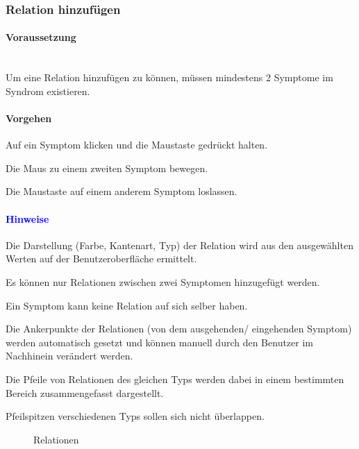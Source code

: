 \documentclass[enabledeprecatedfontcommands,fontsize=11pt,paper=a4,twoside]{scrartcl}
\newcounter{one}
\newcounter{two}[one]
\newcommand*{\hint}{\paragraph{\textcolor{blue}{Hinweise}}}
\newcommand*{\condition}{\paragraph{Voraussetzung}$\;$ \vspace{0.2cm}\\}
\newcommand*{\action}{\paragraph{Vorgehen}}
\let\tempone\itemize
\let\temptwo\enditemize
\renewenvironment{itemize}{\tempone\addtolength{\itemsep}{-10.0pt}}{\temptwo}
\let\origenumerate\enumerate
\let\origendenumerate\endenumerate
\renewenvironment{enumerate}{\origenumerate \addtolength{\itemsep}{-10.0pt}}{\origendenumerate}
\begin{document}
		\subsubsection{Relation hinzufügen}
		\condition
		Um eine Relation hinzufügen zu können, müssen mindestens 2 Symptome im Syndrom existieren. 
		\action
		\begin{enumerate}
			\item Auf ein Symptom klicken und die Maustaste gedrückt halten.
			\item Die Maus zu einem zweiten Symptom bewegen. 
			\item Die Maustaste auf einem anderem Symptom loslassen. 
		\end{enumerate}
		\hint
		\begin{itemize}
			\item Die Darstellung (Farbe, Kantenart, Typ) der Relation wird aus den ausgewählten Werten auf der Benutzeroberfläche ermittelt. 
			\item Es können nur Relationen zwischen zwei Symptomen hinzugefügt werden. 
			\item Ein Symptom kann keine Relation auf sich selber haben.
			\item Die Ankerpunkte der Relationen (von dem ausgehenden/ eingehenden Symptom) werden automatisch gesetzt und können manuell durch den Benutzer im Nachhinein verändert werden. 
			\item Die Pfeile von Relationen des gleichen Typs werden dabei in einem bestimmten Bereich zusammengefasst dargestellt. 
			\item Pfeilspitzen verschiedenen Typs sollen sich nicht überlappen.
		\end{itemize}
		
		\begin{figure}[ht!]
			\centering
			\caption{Relationen}	
		\end{figure}
		
\end{document}
